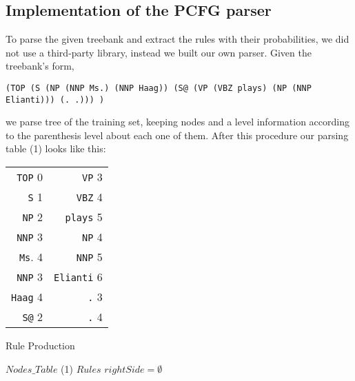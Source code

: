 \documentclass[a4paper,11pt]{article}
\begin{document}
\subsection{Implementation of the PCFG parser}
To parse the given treebank and extract the rules with their probabilities, we did not use a third-party library, instead we built our own parser. Given the treebank's form,
\begin{verbatim}
(TOP (S (NP (NNP Ms.) (NNP Haag)) (S@ (VP (VBZ plays) (NP (NNP Elianti))) (. .))) )
\end{verbatim}
we parse tree of the training set, keeping nodes and a level information according to the parenthesis level about each one of them. After this procedure our parsing table (1) looks like this:
\begin{table}[h!]
\begin{scriptsize}
\begin{center}
\begin{tabular}{ r r }
\texttt{TOP} 0         &      \texttt{VP} 3 \\
\texttt{S} 1           &      \texttt{VBZ} 4   \\
\texttt{NP} 2          &      \texttt{plays} 5     \\           
\texttt{NNP} 3         &      \texttt{NP} 4\\
\texttt{Ms}. 4          &     \texttt{NNP} 5     \\                     
\texttt{NNP} 3         &      \texttt{Elianti} 6\\
\texttt{Haag} 4        &      \texttt{.} 3\\
\texttt{S@} 2          &      \texttt{.} 4
\end{tabular}
\end{center}
\end{scriptsize}
\end{table}

\begin{algorithm}[t!]
\caption{Rule Production}
\label{rule}
\begin{small}
\begin{algorithmic}[1]
$Nodes\_Table$ (1)
$Rules$
\STATE
{}
\STATE $rightSide = \emptyset$
\ELSE
{}
\ENDIF
\ENDIF
{}
\ENDIF
\ENDIF
\ENDFOR
\ENDFOR
\end{algorithmic}
\end{small}
\end{algorithm}
\end{document}
